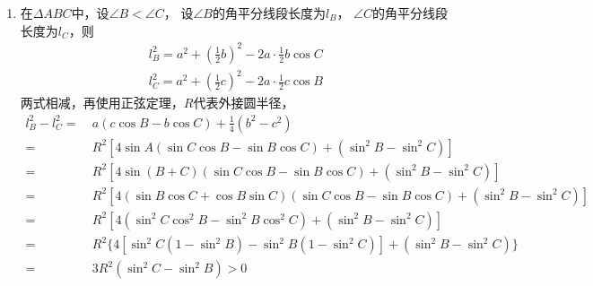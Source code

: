 \begin{enumerate}[label={\textbf{\thechapter.\arabic*}},leftmargin=
    \inteval{\myenumleftmargin}pt]
\item 在$ \Delta ABC $中，设$ \angle B<\angle C $，
设$ \angle B $的角平分线段长度为$ l_B $，
$ \angle C $的角平分线段长度为$ l_C $，则
\begin{gather*}
    l_B^2=a^2+\left(\frac{1}{2}b\right)^2-2a\cdot \frac{1}{2}b
    \cos C \\
    l_C^2=a^2+\left(\frac{1}{2}c\right)^2-2a\cdot \frac{1}{2}c
    \cos B 
\end{gather*}
两式相减，再使用正弦定理，$ R $代表外接圆半径，
\begin{align*}
    l_B^2-l_C^2= &\ a(c\cos B-b\cos C) +\frac{1}{4}(b^2-c^2) \\
    =&\ R^2[4\sin A(\sin C\cos B-\sin B\cos C)+(\sin^2B-
    \sin^2C)] \\
    =&\ R^2[4\sin(B+C)(\sin C\cos B-\sin B\cos C)+(\sin^2B-
    \sin^2C)] \\
    =&\ R^2[4(\sin B\cos C+\cos B\sin C)(\sin C\cos B-
    \sin B\cos C)+(\sin^2B-\sin^2C)] \\
    =&\ R^2[4(\sin^2C\cos^2B-\sin^2B\cos^2C)+(\sin^2B-
    \sin^2C)] \\
    =&\ R^2\{4[\sin^2C(1-\sin^2B)-\sin^2B(1-\sin^2C)]+(\sin^2B-
    \sin^2C)\} \\
    =&\ 3R^2(\sin^2C-\sin^2B) >0
\end{align*}

\end{enumerate}
\myfootnote{\CopyrightStatementChap}

\cleardoublepage




